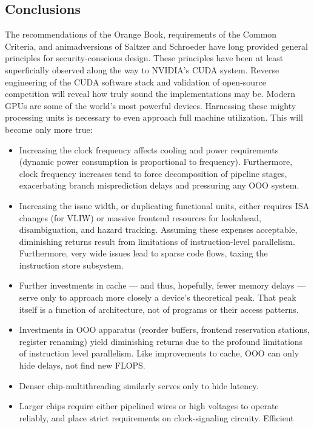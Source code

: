 \documentclass[letterpaper,10pt]{article}
\begin{document}
\begin{multicols}{2}
 \section{Conclusions} 
The recommendations of the Orange Book\cite{orangebook}, requirements of the Common Criteria\cite{ccrit},
and animadversions of Saltzer and Schroeder\cite{principles} have long provided general principles for
security-conscious design. These principles have been at least superficially
observed along the way to NVIDIA's CUDA system. Reverse engineering of the
CUDA software stack and validation of open-source competition will reveal how
truly sound the implementations may be. Modern GPUs are some of the world's most powerful devices. Harnessing these
mighty processing units is necessary to even approach full machine utilization.
This will become only more true:
\begin{itemize}
\item Increasing the clock frequency affects cooling and power requirements
(dynamic power consumption is proportional to frequency). Furthermore,
clock frequency increases tend to force decomposition of pipeline
stages, exacerbating branch misprediction delays and pressuring any OOO
system\cite{cormean}.
\item Increasing the issue width, or duplicating functional units, either
requires ISA changes (for VLIW) or massive frontend resources for lookahead,
disambiguation, and hazard tracking. Assuming these expenses acceptable,
diminishing returns result from limitations of instruction-level parallelism.
Furthermore, very wide issues lead to sparse code flows, taxing the instruction
store subsystem. 
\item Further investments in cache --- and thus, hopefully, fewer memory
delays --- serve only to approach more closely a device's theoretical peak.
That peak itself is a function of architecture, not of programs or their
access patterns.
\item Investments in OOO apparatus (reorder buffers,
frontend reservation stations, register renaming) yield diminishing returns due
to the profound limitations of instruction level parallelism\cite{phenn}. Like improvements
to cache, OOO can only hide delays, not find new FLOPS\@.
\item Denser chip-multithreading similarly serves only to hide latency.
\item Larger chips require either pipelined wires or high voltages to operate
reliably, and place strict requirements on clock-signaling circuity. Efficient

\end{itemize}
\end{multicols}
\end{document}
